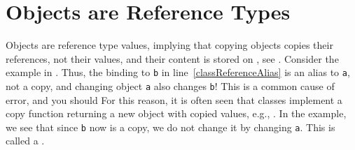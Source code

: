\begin{comment}
Combinations of non-static member definitions are shown in \Cref{classMemberDefinition}.
%
\fsCode{classMemberDefinition}{classMemberDefinition}{A large variation of class member definitions. This program intentionally does not compile, but demonstrates variation that will, and problematic lines are indicated by the in-code comments.}{}
%
The \lstinline{val}-keyword in this context has not been discussed previously.\jon{maybe mention ``Explicit Field'', \url{https://docs.microsoft.com/en-us/dotnet/fsharp/language-reference/members/explicit-fields-the-val-keyword}.} \lstinline{staticMemberV} and \lstinline{staticMemberValV} have the same interface. The \lstinline{[<DefaultValue>] val mutable valMutableV : int} has not been discussed and is discouraged, but gives a mutable property that is initialized to the type's default value, e.g., \lstinline{Unchecked.defaultof<int>} in this case. \idx{\lstinline{[<DefaultValue>]}} is called an \idx{attribute}, but will not be discussed further.\jon{Should attributes be included \url{https://docs.microsoft.com/en-us/dotnet/fsharp/language-reference/attributes}?} Defining mutable properties is illegal, but allowed using explicit get and set functions. The definitions for \lstinline{valMutableV}, \lstinline{memberValGetSetV} and \lstinline{memberThisGetSetV} gives the same interface to a mutable variable, but with slight variation in how their initial value is set, and how get and set actions can be programmed. In general, \advice{minimize the use of constructions using the \keyword{val}-keyword in class definitions for brevity.}  All the above holds for static definitions except \lstinline{[<DefaultValue>] static val mutable staticValMutableV : int} is illegal.

\end{comment}
\section{Objects are Reference Types}
Objects are reference type values, implying that copying objects copies their references, not their values, and their content is stored on , see . Consider the example in .
%
%
Thus, the binding to \lstinline{b} in line~\ref{classReferenceAlias} is an alias to \lstinline{a}, not a copy, and changing object \lstinline{a} also changes \lstinline{b}! This is a common cause of error, and you should  For this reason, it is often seen that classes implement a copy function returning a new object with copied values, e.g., .
%
%
In the example, we see that since \lstinline{b} now is a copy, we do not change it by changing \lstinline{a}. This is called a .

